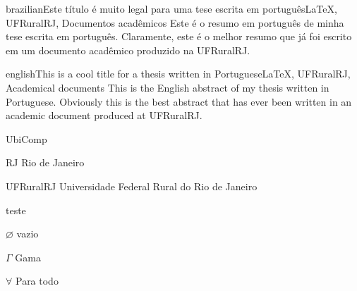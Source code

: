 \documentclass[tese]{UFRuralRJ}
\begin{document}
\def\tituloportugues{Este título é muito legal para uma tese escrita em português} %
\def\chavesportugues{LaTeX, UFRuralRJ, Documentos acadêmicos} %

\generalabstracttrue %
\begin{generalabstract}{brazilian}{\tituloportugues}{\chavesportugues} %
  Este é o resumo em português de minha tese escrita em português. Claramente, 
  este é o melhor resumo que já foi escrito em um documento acadêmico produzido
  na UFRuralRJ.
\end{generalabstract}

\def\tituloingles{This is a cool title for a thesis written in Portuguese} %
\def\chavesingles{LaTeX, UFRuralRJ, Academical documents} %

\generalabstracttrue
\begin{generalabstract}{english}{\tituloingles}{\chavesingles} %
  This is the English abstract of my thesis written in Portuguese. Obviously this
  is the best abstract that has ever been written in an academic document produced
  at UFRuralRJ.
\end{generalabstract}


\listoffigures %
\listoftables %
\listofappendix %

\begin{listofabbrv}{UbiComp} %
 \item [RJ] Rio de Janeiro
 \item [UFRuralRJ] Universidade Federal Rural do Rio de Janeiro
\end{listofabbrv}

\begin{listofsymbols}{teste} %
 \item [$\varnothing$] vazio %
 \item [$\Gamma$]  Gama      %
 \item [$\forall$] Para todo
\end{listofsymbols}
\end{document}
